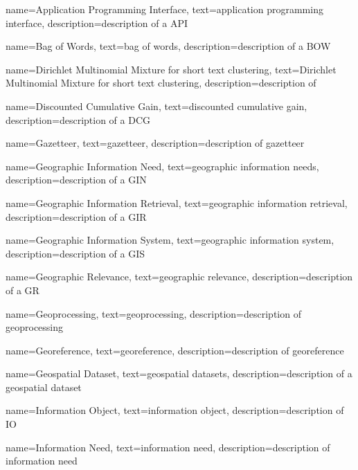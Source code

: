 
{
    name=Application Programming Interface,
    text=application programming interface,
    description=description of a API
}


{
    name=Bag of Words,
    text=bag of words,
    description=description of a BOW
}

{
    name=Dirichlet Multinomial Mixture for short text clustering,
    text=Dirichlet Multinomial Mixture for short text clustering,
    description=description of 
}

{
    name=Discounted Cumulative Gain,
    text=discounted cumulative gain,
    description=description of a DCG
}

{
    name=Gazetteer,
    text=gazetteer,
    description=description of gazetteer
}

{
    name=Geographic Information Need,
    text=geographic information needs,
    description=description of a GIN
}

{
    name=Geographic Information Retrieval,
    text=geographic information retrieval,
    description=description of a GIR
}

{
    name=Geographic Information System,
    text=geographic information system,
    description=description of a GIS
}

{
    name=Geographic Relevance,
    text=geographic relevance,
    description=description of a GR
}

{
    name=Geoprocessing,
    text=geoprocessing,
    description=description of geoprocessing
}

{
    name=Georeference,
    text=georeference,
    description=description of georeference
}

{
    name=Geospatial Dataset,
    text=geospatial datasets,
    description=description of a geospatial dataset
}

{
    name=Information Object,
    text=information object,
    description=description of IO
}

{
    name=Information Need,
    text=information need,
    description=description of information need
}


